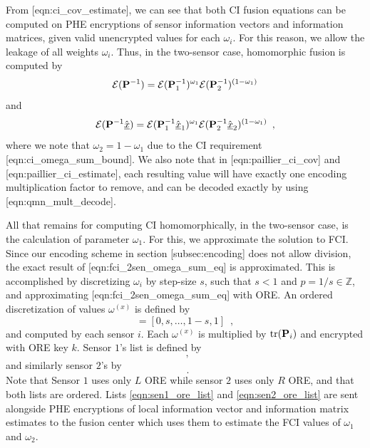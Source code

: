 From [eqn:ci\_cov\_estimate], we can see that both CI fusion equations can be computed on PHE encryptions of sensor information vectors and information matrices, given valid unencrypted values for each $\omega_i$. For this reason, we allow the leakage of all weights $\omega_i$. Thus, in the two-sensor case, homomorphic fusion is computed by
\begin{equation}
   \mathcal{E}({{\mathbf{P}}}^{-1}) = \mathcal{E}({{\mathbf{P}}}^{-1}_1)^{\omega_1}\mathcal{E}({{\mathbf{P}}}^{-1}_2)^{(1 -\omega_1)} \label{eqn:paillier_ci_cov}
\end{equation}
and
\begin{equation}
   \mathcal{E}({{\mathbf{P}}}^{-1}\hat{{\underline{x}}}) = \mathcal{E}({{\mathbf{P}}}^{-1}_1\hat{{\underline{x}}}_1)^{\omega_1}\mathcal{E}({{\mathbf{P}}}^{-1}_2\hat{{\underline{x}}}_2)^{(1 - \omega_1)}\enspace, \label{eqn:paillier_ci_estimate}
\end{equation}
where we note that $\omega_2=1-\omega_1$ due to the CI requirement [eqn:ci\_omega\_sum\_bound]. We also note that in [eqn:paillier\_ci\_cov] and [eqn:paillier\_ci\_estimate], each resulting value will have exactly one encoding multiplication factor to remove, and can be decoded exactly by using [eqn:qmn\_mult\_decode].
   
All that remains for computing CI homomorphically, in the two-sensor case, is the calculation of parameter $\omega_1$. For this, we approximate the solution to FCI. Since our encoding scheme in section [subsec:encoding] does not allow division, the exact result of [eqn:fci\_2sen\_omega\_sum\_eq] is approximated. This is accomplished by discretizing $\omega_i$ by step-size $s$, such that $s<1$ and $p=1/s \in \mathbb{Z}$, and approximating [eqn:fci\_2sen\_omega\_sum\_eq] with ORE. An ordered discretization of values $\omega^{(x)}$ is defined by
\begin{equation}
   [\omega^{(1)},\dots,\omega^{(p)}] = [0,s,\dots,1-s,1]\enspace,
\end{equation}
and computed by each sensor $i$. Each $\omega^{(x)}$ is multiplied by $\operatorname{tr}({{\mathbf{P}}}_i)$ and encrypted with ORE key $k$. Sensor $1$'s list is defined by 
\begin{equation}
   [\mathcal{E}^L_{ORE}(\omega^{(1)}\tr(\mP_1)),\dots,\mathcal{E}^L_{ORE}(\omega^{(p)}\tr(\mP_1))]\enspace, \label{eqn:sen1_ore_list}
\end{equation}
and similarly sensor $2$'s by
\begin{equation}
   [\mathcal{E}^R_{ORE}(\omega^{(1)}\tr(\mP_2)),\dots,\mathcal{E}^R_{ORE}(\omega^{(p)}\tr(\mP_2))]\enspace. \label{eqn:sen2_ore_list}
\end{equation}
Note that Sensor $1$ uses only $L$ ORE while sensor $2$ uses only $R$ ORE, and that both lists are ordered. Lists \eqref{eqn:sen1_ore_list} and \eqref{eqn:sen2_ore_list} are sent alongside PHE encryptions of local information vector and information matrix estimates to the fusion center which uses them to estimate the FCI values of $\omega_1$ and $\omega_2$.

